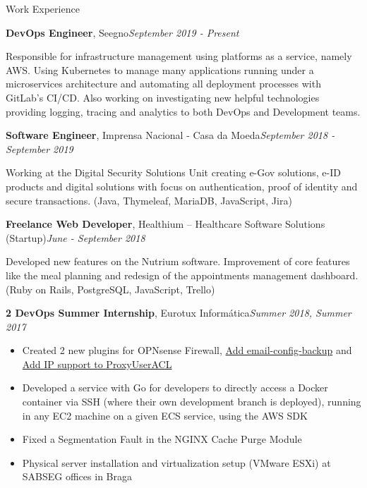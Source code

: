 \documentclass{resume}
\begin{document}
\begin{rSection}{Work Experience}

\begin{rSubsection}
{\textbf{DevOps Engineer}, Seegno}{\em September 2019 - Present}{}{}
\begin{shifted}
Responsible for infrastructure management using platforms as a service, namely AWS. Using Kubernetes to manage many applications running under a microservices architecture and automating all deployment processes with GitLab's CI/CD. Also working on investigating new helpful technologies providing logging, tracing and analytics to both DevOps and Development teams.
\end{shifted}
\end{rSubsection}

\begin{rSubsection}
{\textbf{Software Engineer}, Imprensa Nacional - Casa da Moeda}{\em September 2018 - September 2019}{}{}
\begin{shifted}
Working at the Digital Security Solutions Unit creating e-Gov solutions, e-ID products and digital solutions with focus on authentication, proof of identity and secure transactions. (Java, Thymeleaf, MariaDB, JavaScript, Jira)
\end{shifted}
\end{rSubsection}

\begin{rSubsection}
{\textbf{Freelance Web Developer}, Healthium – Healthcare Software Solutions (Startup)}{\em June - September 2018}{}{}
\begin{shifted}
Developed new features on the Nutrium software. Improvement of core features like the meal planning and redesign of the appointments management dashboard. (Ruby on Rails, PostgreSQL, JavaScript, Trello)
\end{shifted}
\end{rSubsection}

\begin{rSubsection}
{\textbf{2 DevOps Summer Internship}, Eurotux Informática}{\em Summer 2018, Summer 2017}{}{}
\begin{itemize}[noitemsep]
    \item {Created 2 new plugins for OPNsense Firewall, \href{https://github.com/opnsense/plugins/pull/788}{Add email-config-backup} and \href{https://github.com/opnsense/plugins/pull/748}{Add IP support to ProxyUserACL} }
    \item {Developed a service with Go for developers to directly access a Docker container via SSH (where their own development branch is deployed), running in any EC2 machine on a given ECS service, using the AWS SDK}
    \item {Fixed a Segmentation Fault in the NGINX Cache Purge Module}
    \item {Physical server installation and virtualization setup (VMware ESXi) at SABSEG offices in Braga}
\end{itemize}
\end{rSubsection}

\end{rSection}
\end{document}
